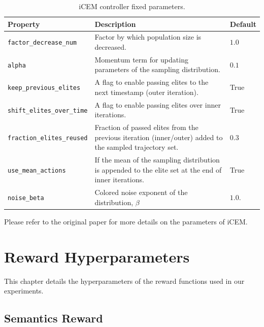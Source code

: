 
\begin{table}[H]
    \centering
    \caption{iCEM controller fixed parameters.}
    \begin{tabularx}{\textwidth}{C{4.7cm} L C{2cm}}
        \hline
        Property & Description & Default\\
        \hline
        \texttt{factor\_decrease\_num} & Factor by which population size is decreased. & \(1.0\)\\
        \texttt{alpha} & Momentum term for updating parameters of the sampling distribution. & \(0.1\)\\
        \texttt{keep\_previous\_elites} & A flag to enable passing elites to the next timestamp (outer iteration). & True\\
        \texttt{shift\_elites\_over\_time} & A flag to enable passing elites over inner iterations. & True\\
        \texttt{fraction\_elites\_reused} & Fraction of passed elites from the previous iteration (inner/outer) added to the sampled trajectory set. & \(0.3\)\\
        \texttt{use\_mean\_actions} & If the mean of the sampling distribution is appended to the elite set at the end of inner iterations. & True\\
        \texttt{noise\_beta} & Colored noise exponent of the distribution, \(\beta\) & \(1.0\).\\
        \hline
    \end{tabularx}
    \label{tab:icem-params-fixed}
\end{table}

Please refer to the original paper for more details on the parameters of iCEM.

\chapter{Reward Hyperparameters}
\label{sec:reward-details}

This chapter details the hyperparameters of the reward functions used in our experiments.

\section{Semantics Reward}
\label{sec:semantics-reward-details}

